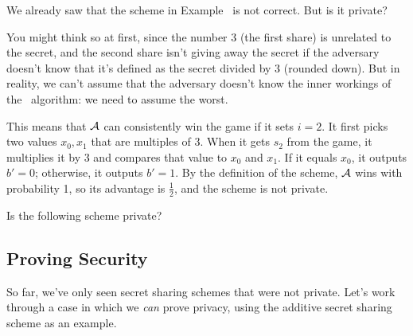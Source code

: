 \begin{example}
    We already saw that the scheme in Example~ is not correct.
    But is it private?

    You might think so at first, since the number 3 (the first share) is
    unrelated to the secret, and the second share isn't giving away the 
    secret if the adversary doesn't know that it's defined as the secret 
    divided by 3 (rounded down).
    But in reality, we can't assume that the adversary doesn't know the 
    inner workings of the \share~algorithm: we need to assume the worst.
    
    This means that $\mathcal{A}$ can consistently win the game if it sets $i = 2$.
    It first picks two values $x_0, x_1$ that are multiples of 3.
    When it gets $s_2$ from the game, it multiplies it by 3 and compares that 
    value to $x_0$ and $x_1$. If it equals $x_0$, it outputs $b' = 0$; 
    otherwise, it outputs $b' = 1$. By the definition of the scheme, $\mathcal{A}$ 
    wins with probability 1, so its advantage is $\frac{1}{2}$, and the 
    scheme is not private.
\end{example}

\begin{bonus}
    Is the following scheme private?
    \begin{pchstack}[center]
    \pchspace
    \end{pchstack}
\end{bonus}

\subsection[Proving Security*]{Proving Security}\label{sec:proof}

So far, we've only seen secret sharing schemes that were not private.
Let's work through a case in which we \emph{can} prove privacy, using the additive secret sharing 
scheme as an example.

